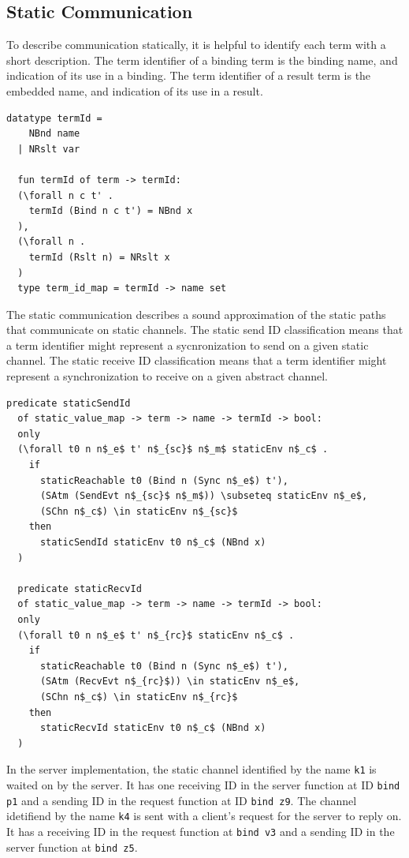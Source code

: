 \documentclass[10pt]{article}
\begin{document}
\subsection{Static Communication}
To describe communication statically, it is helpful to identify each term with a short description.
The term identifier of a binding term is the binding name, and indication of its use in a binding.
The term identifier of a result term is the embedded name, and indication of its use in a result.

\begin{lstlisting}[language=logic, mathescape]
  datatype termId =
    NBnd name
  | NRslt var

  fun termId of term -> termId:
  (\forall n c t' . 
    termId (Bind n c t') = NBnd x
  ),
  (\forall n . 
    termId (Rslt n) = NRslt x
  )
  type term_id_map = termId -> name set
\end{lstlisting}

The static communication describes a sound approximation of
the static paths that communicate on static channels.
The static send ID classification means that a term identifier might represent a
sycnronization to send on a given static channel.
The static receive ID classification means that a term identifier might represent a
synchronization to receive on a given abstract channel. 

\begin{lstlisting}[language=logic, mathescape]
  predicate staticSendId
  of static_value_map -> term -> name -> termId -> bool:
  only
  (\forall t0 n n$_e$ t' n$_{sc}$ n$_m$ staticEnv n$_c$ .
    if
      staticReachable t0 (Bind n (Sync n$_e$) t'),
      (SAtm (SendEvt n$_{sc}$ n$_m$)) \subseteq staticEnv n$_e$, 
      (SChn n$_c$) \in staticEnv n$_{sc}$
    then
      staticSendId staticEnv t0 n$_c$ (NBnd x)
  )

  predicate staticRecvId
  of static_value_map -> term -> name -> termId -> bool:
  only
  (\forall t0 n n$_e$ t' n$_{rc}$ staticEnv n$_c$ .
    if
      staticReachable t0 (Bind n (Sync n$_e$) t'),
      (SAtm (RecvEvt n$_{rc}$)) \in staticEnv n$_e$, 
      (SChn n$_c$) \in staticEnv n$_{rc}$ 
    then
      staticRecvId staticEnv t0 n$_c$ (NBnd x)
  )
\end{lstlisting}


In the server implementation,
the static channel identified by the name \lstinline{k1} is waited on
by the server.  It has one receiving ID in the server function
at ID \lstinline[language=sugar_lang]{bind p1} and a sending ID
in the request function at ID \lstinline[language=sugar_lang]{bind z9}.
The channel idetifiend by the name \lstinline{k4} is sent with a client's request for
the server to reply on. It has a receiving ID in the request function at
\lstinline[language=sugar_lang]{bind v3} and a sending ID in the server function at
\lstinline[language=sugar_lang]{bind z5}.
\end{document}
